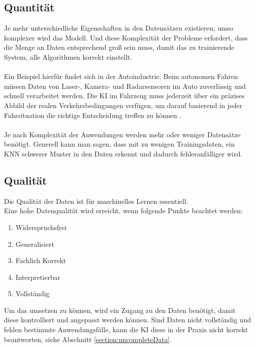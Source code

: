 \documentclass[12pt,oneside,a4paper,parskip]{scrbook}
\begin{document}
\subsection{Quantität}
\label{section:DataQuantity}
Je mehr unterschiedliche Eigenschaften in den Datensätzen existieren, umso komplexer wird das Modell. Und diese Komplexität der Probleme erfordert, dass die Menge an Daten entsprechend groß sein muss, damit das zu trainierende System, alle Algorithmen korrekt einstellt.
\\\\
Ein Beispiel hierfür findet sich in der Autoindustrie. Beim autonomen Fahren müssen Daten von Laser-, Kamera- und Radarsensoren im Auto zuverlässig und schnell verarbeitet werden. Die KI im Fahrzeug muss jederzeit über ein präzises Abbild der realen Verkehrsbedingungen verfügen, um darauf basierend in jeder Fahrsituation die richtige Entscheidung treffen zu können \cite{autonomesFahren}.
\\\\
Je nach Komplexität der Anwendungen werden mehr oder weniger Datensätze benötigt. Generell kann man sagen, dass mit zu wenigen Trainingsdaten, ein KNN schwerer Muster in den Daten erkennt und dadurch fehleranfälliger wird.

\subsection{Qualität}
\label{section:DataQuality}

Die Qualität der Daten ist für maschinelles Lernen essentiell. \\Eine hohe Datenqualität wird erreicht, wenn folgende Punkte beachtet werden:
\begin{enumerate}
	\item Widerspruchsfrei
	\item Generalisiert
	\item Fachlich Korrekt
	\item Interpretierbar
	\item Vollständig
\end{enumerate}

Um das umsetzen zu können, wird ein Zugang zu den Daten benötigt, damit diese kontrolliert und angepasst werden können. Sind Daten nicht vollständig und fehlen bestimmte Anwendungsfälle, kann die KI diese in der Praxis nicht korrekt beantworten, siehe Abschnitt \ref{section:uncompleteData}.
\end{document}
